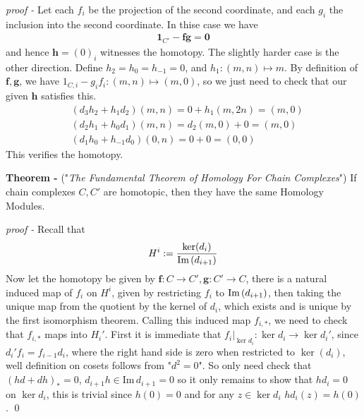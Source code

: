 \documentclass[11pt]{article}
\theoremstyle{definition}
\newcommand{\im}{\text{Im\,}}
\begin{document}
\emph{proof - } Let each \(f_i\) be the projection of the second coordinate, and each \(g_i\) the inclusion into the second coordinate. In thise case we have
\begin{align*}
    \mathbf{1}_{C'} - \mathbf{fg} = \mathbf{0}
\end{align*}
and hence \(\mathbf{h} = (0)_i\) witnesses the homotopy. The slightly harder case is the other direction. Define \(h_2 = h_0 = h_{-1} = 0\), and \(h_1: (m,n) \mapsto m\). By definition of \(\mathbf{f}, \mathbf{g}\), we have \(1_{C,i} - g_if_i: (m,n) \mapsto (m,0)\), so we just need to check that our given \(\mathbf{h}\) satisfies this.
\begin{align*}
    &(d_3h_2 + h_1d_2)(m,n) = 0 + h_1(m,2n) = (m,0) \\
    &(d_2h_1 + h_0d_1)(m,n) = d_2(m,0) + 0 = (m,0) \\
    &(d_1h_0 + h_{-1}d_0)(0,n) = 0 + 0 = (0,0)
\end{align*}
This verifies the homotopy.




\textbf{Theorem - }\label{CCEx4} ("\emph{The Fundamental Theorem of Homology For Chain Complexes}") If chain complexes \(C,C'\) are homotopic, then they have the same Homology Modules.

\emph{proof - } Recall that
\begin{align*}
    H^i := \frac{\ker(d_i)}{\im(d_{i+1})}
\end{align*}
Now let the homotopy be given by \(\mathbf{f}:C \to C', \mathbf{g}:C' \to C\), there is a natural induced map of \(f_i\) on \(H^i\), given by restricting \(f_i\) to \(\im(d_{i+1})\), then taking the unique map from the quotient by the kernel of \(d_i\), which exists and is unique by the first isomorphism theorem. Calling this induced map \(f_{i,*}\), we need to check that
\(f_{i,*}\) maps into \(H_i'\). First it is immediate that \(f_i\vert_{\ker{d_i}}: \ker d_i \to \ker d_i'\), since \(d_i'f_i = f_{i-1}d_i\), where the right hand side is zero when restricted to \(\ker(d_i)\), well definition on cosets follows from "\(d^2 = 0\)". So only need check that \((hd + dh)_* = 0\), \(d_{i+1}h \in \text{Im}\, d_{i+1} = 0\) so it only remains to show that \(hd_i = 0\) on \(\ker d_i\), this is trivial since \(h(0) = 0\) and for any \(z \in \ker d_i\) \(hd_i(z) = h(0)\). \qed


\end{document}
